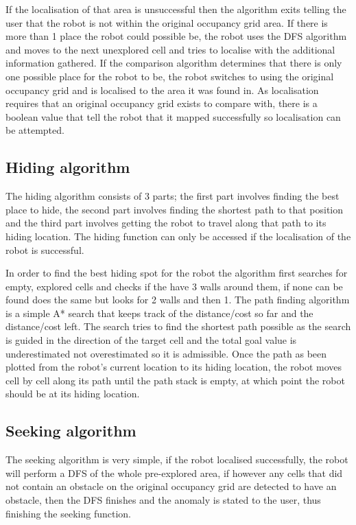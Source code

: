 \documentclass[a4paper,12pt]{article}
\begin{document}
\vspace{5mm}
\noindent If the localisation of that area is unsuccessful then the algorithm exits telling the user that the robot is not within the original occupancy grid area. If there is more than 1 place the robot could possible be, the robot uses the DFS algorithm and moves to the next unexplored cell and tries to localise with the additional information gathered. If the comparison algorithm determines that there is only one possible place for the robot to be, the robot switches to using the original occupancy grid and is localised to the area it was found in. As localisation requires that an original occupancy grid exists to compare with, there is a boolean value that tell the robot that it mapped successfully so localisation can be attempted.

\subsection{Hiding algorithm}
\noindent The hiding algorithm consists of 3 parts; the first part involves finding the best place to hide, the second part involves finding the shortest path to that position and the third part involves getting the robot to travel along that path to its hiding location. The hiding function can only be accessed if the localisation of the robot is successful.

\vspace{5mm}
\noindent In order to find the best hiding spot for the robot the algorithm first searches for empty, explored cells and checks if the have 3 walls around them, if none can be found does the same but looks for 2 walls and then 1. The path finding algorithm is a simple A* search that keeps track of the distance/cost so far and the distance/cost left. The search tries to find the shortest path possible as the search is guided in the direction of the target cell and the total goal value is underestimated not overestimated so it is admissible. Once the path as been plotted from the robot's current location to its hiding location, the robot moves cell by cell along its path until the path stack is empty, at which point the robot should be at its hiding location.

\subsection{Seeking algorithm}
\noindent The seeking algorithm is very simple, if the robot localised successfully, the robot will perform a DFS of the whole pre-explored area, if however any cells that did not contain an obstacle on the original occupancy grid are detected to have an obstacle, then the DFS finishes and the anomaly is stated to the user, thus finishing the seeking function.
\end{document}
